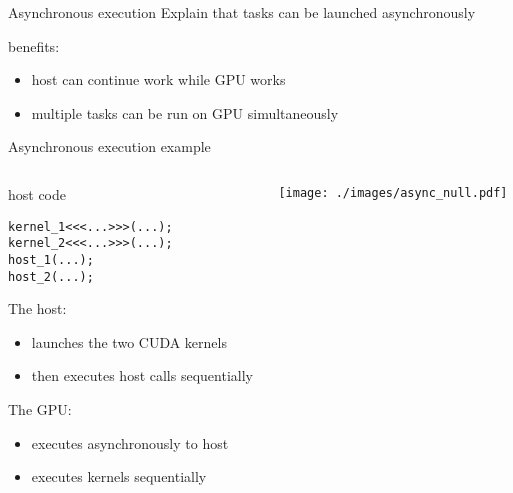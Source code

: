
\begin{frame}[fragile]{Asynchronous execution}
    Explain that tasks can be launched asynchronously

    benefits:
    \begin{itemize}
        \item host can continue work while GPU works
        \item multiple tasks can be run on GPU simultaneously
    \end{itemize}

\end{frame}

\begin{frame}[fragile]{Asynchronous execution example}
    \begin{columns}[T]
        \begin{column}{0.5\textwidth}
            \begin{codecolumn}{host code}
                \begin{lstlisting}[style=boxcudatiny]
kernel_1<<<...>>>(...);
kernel_2<<<...>>>(...);
host_1(...);
host_2(...);
                \end{lstlisting}
            \end{codecolumn}
        The host:
        \begin{itemize}
            \item launches the two CUDA kernels
            \item then executes host calls sequentially 
        \end{itemize}
        The GPU:
        \begin{itemize}
            \item executes asynchronously to host
            \item executes kernels sequentially
        \end{itemize}
        \end{column}
        \begin{column}{0.5\textwidth}
                \texttt{[image: ./images/async\_null.pdf]}
        \end{column}
    \end{columns}
\end{frame}

